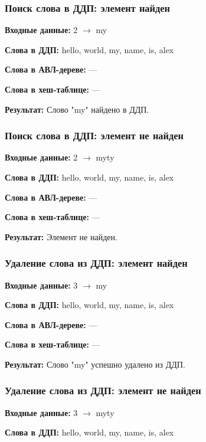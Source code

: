 \documentclass[a4paper,12pt]{extarticle}
\begin{document}

\subsubsection{Поиск слова в ДДП: элемент найден}

\textbf{Входные данные: }
2 $\rightarrow$ my

\textbf{Слова в ДДП: }
hello, world, my, name, is, alex

\textbf{Слова в АВЛ-дереве: }
---

\textbf{Слова в хеш-таблице: }
---

\textbf{Результат: }
Слово "my" найдено в ДДП.


\subsubsection{Поиск слова в ДДП: элемент не найден}

\textbf{Входные данные: }
2 $\rightarrow$ myty

\textbf{Слова в ДДП: }
hello, world, my, name, is, alex

\textbf{Слова в АВЛ-дереве: }
---

\textbf{Слова в хеш-таблице: }
---

\textbf{Результат: }
Элемент не найден.

\subsubsection{Удаление слова из ДДП: элемент найден}

\textbf{Входные данные: }
3 $\rightarrow$ my

\textbf{Слова в ДДП: }
hello, world, my, name, is, alex

\textbf{Слова в АВЛ-дереве: }
---

\textbf{Слова в хеш-таблице: }
---

\textbf{Результат: }
Слово "my" успешно удалено из ДДП.


\subsubsection{Удаление слова из ДДП: элемент не найден}

\textbf{Входные данные: }
3 $\rightarrow$ myty

\textbf{Слова в ДДП: }
hello, world, my, name, is, alex
\end{document}
